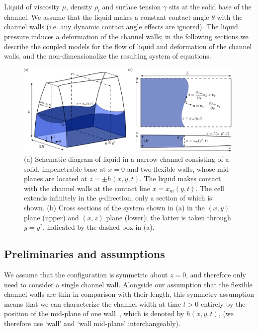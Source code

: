 \documentclass{jfm}
\begin{document}
 Liquid of viscosity $\mu$, density $\rho_l$ and surface tension $\gamma$ sits at the solid base of the channel. We assume that the liquid makes a constant contact angle $\theta$ with the channel walls (i.e. any dynamic contact angle effects are ignored). The liquid pressure induces a deformation of the channel walls; in the following sections we describe the coupled models for the flow of liquid and deformation of the channel walls, and the non-dimensionalize the resulting system of equations.

\begin{figure}
\centering
\includegraphics[width=0.99\textwidth]{figures/fig4_schematic.pdf}
\caption{(a) Schematic diagram of liquid in a narrow channel consisting of a solid, impenetrable base at $x =0$ and two flexible walls, whose mid-planes are located at $z = \pm h(x,y,t)$. The liquid makes contact with the channel walls at the contact line $x = x_m(y,t)$. The cell extends infinitely in the $y$-direction, only a section of which is shown. (b) Cross sections of the system shown in (a) in the $(x,y)$ plane (upper) and $(x,z)$ plane (lower); the latter is taken through $y = y^*$, indicated by the dashed box in (a).}
\label{fig:Modelling:Schematic}
\end{figure}

\subsection{Preliminaries and assumptions}
We assume that the configuration is symmetric about $z = 0$, and therefore only need to consider a single channel wall. Alongside our assumption that the flexible channel walls are thin in comparison with their length, this symmetry assumption means that we can characterize the channel width at time $t > 0$ entirely by the position of the mid-plane of one wall~\citep{Reddy2006}, which is denoted by $h(x,y,t)$, (we therefore use `wall' and `wall mid-plane' interchangeably).
\end{document}
